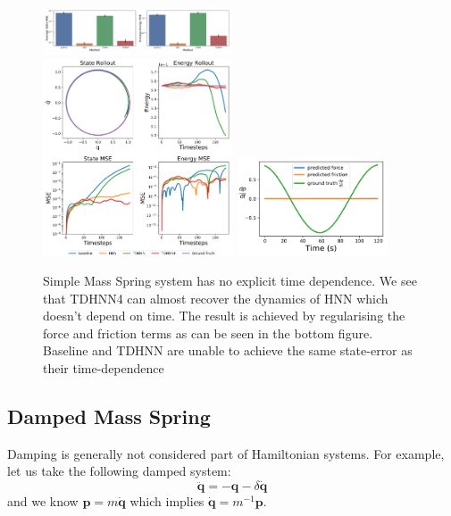\documentclass[twoside]{article}
\begin{document}
\begin{figure}[h!]
\centering
\includegraphics[width=0.5\textwidth]{figures/mass_spring_errors.pdf}
\includegraphics[width=0.5\textwidth]{figures/mass_spring_long.pdf}
\includegraphics[width=0.4\textwidth]{figures/mass_spring_pred_force.pdf}
\caption{Simple Mass Spring system has no explicit time dependence. We see that TDHNN4 can almost recover the dynamics of HNN which doesn't depend on time. The result is achieved by regularising the force and friction terms as can be seen in the bottom figure. Baseline and TDHNN are unable to achieve the same state-error as their time-dependence }
\label{mspring}
\end{figure}


\subsection{Damped Mass Spring}

Damping is generally not considered part of Hamiltonian systems. For example, let us take the following damped system:
\begin{equation}
\ddot{\mathbf{q}} = -\mathbf{q} - \delta\dot{\mathbf{q}}
\end{equation}
and we know $\mathbf{p}=m\dot{\mathbf{q}}$ which implies $\dot{\mathbf{q}} = m^{-1}\mathbf{p}$.
\end{document}
